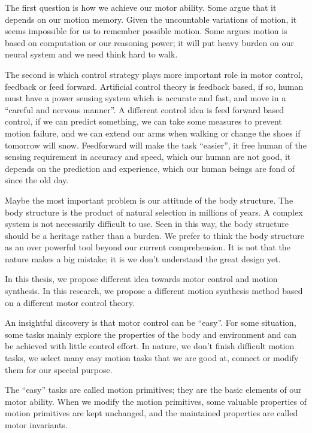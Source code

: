 \begin{itemize}
The first question is how we achieve our motor ability. Some argue that it depends on our motion memory. Given the uncountable variations of motion, it seems impossible for us to remember possible motion. Some argues motion is based on computation or our reasoning power; it will put heavy burden on our neural system and we need think hard to walk.
	
The second is which control strategy plays more important role in motor control, feedback or feed forward. Artificial control theory is feedback based, if so, human must have a power sensing system which is accurate and fast, and move in a “careful and nervous manner”. 
A different control idea is feed forward based control, if we can predict something, we can take some measures to prevent motion failure, and we can extend our arms when walking or change the shoes if tomorrow will snow.
Feedforward will make the task “easier”, it free human of the sensing requirement in accuracy and speed, which our human are not good, it depends on the prediction and experience, which our human beings are fond of since the old day.
	
Maybe the most important problem is our attitude of the body structure. The body structure is the product of natural selection in millions of years. A complex system is not necessarily difficult to use. Seen in this way, the body structure should be a heritage rather than a burden.  We prefer to think the body structure as an over powerful tool beyond our current comprehension. 
It is not that the nature makes a big mistake; it is we don’t understand the great design yet.

\end{itemize}


In this thesis, we propose different idea towards motor control and motion synthesis.
In this research, we propose a different motion synthesis method based on a different motor control theory.

An insightful discovery is that motor control can be “easy”.
For some situation, some tasks mainly explore the properties of the body and environment and can be achieved with little control effort.
In nature, we don’t finish difficult motion tasks, we select many easy motion tasks that we are good at, connect or modify them for our special purpose.

The “easy” tasks are called motion primitives; they are the basic elements of our motor ability. 
When we modify the motion primitives, some valuable properties of motion primitives are kept unchanged, and the maintained properties are called motor invariants.

